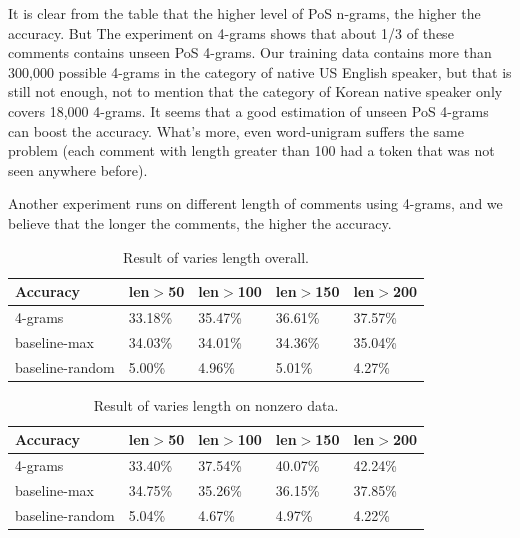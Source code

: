 \documentclass[11pt]{article}
\begin{document}
It is clear from the table that the higher level of PoS n-grams, the higher the accuracy. But The experiment on 4-grams shows that about 1/3 of these comments contains unseen PoS 4-grams. Our training data contains more than 300,000 possible 4-grams in the category of native US English speaker, but that is still not enough, not to mention that the category of Korean native speaker only covers 18,000 4-grams. It seems that a good estimation of unseen PoS 4-grams can boost the accuracy. What's more, even word-unigram suffers the same problem (each comment with length greater than 100 had a token that was not seen anywhere before).

Another experiment runs on different length of comments using 4-grams, and we believe that the longer the comments, the higher the accuracy.

\begin{table}[h]
\begin{center}
\small\addtolength{\tabcolsep}{-5pt}
\begin{tabular}{|l|l|l|l|l|}
\hline Accuracy & \bf len$>$50 & \bf len$>$100 & \bf len$>$150 & \bf len$>$200 \\ \hline
4-grams & 33.18\% & 35.47\%  & 36.61\% & 37.57\% \\
baseline-max & 34.03\% & 34.01\% & 34.36\% & 35.04\% \\
baseline-random & 5.00\% & 4.96\%  & 5.01\% & 4.27\%\\
\hline
\end{tabular}
\end{center}
\caption{\label{font-table} Result of varies length overall. }
\end{table}

\begin{table}[h]
\begin{center}
\small\addtolength{\tabcolsep}{-5pt}
\begin{tabular}{|l|l|l|l|l|}
\hline Accuracy & \bf len$>$50 & \bf len$>$100 & \bf len$>$150 & \bf len$>$200 \\ \hline
4-grams & 33.40\% & 37.54\%  & 40.07\% & 42.24\% \\
baseline-max  & 34.75\% & 35.26\% & 36.15\% & 37.85\% \\
baseline-random  & 5.04\% & 4.67\% & 4.97\% & 4.22\% \\
\hline
\end{tabular}
\end{center}
\caption{\label{font-table} Result of varies length on nonzero data. }
\end{table}
\end{document}
